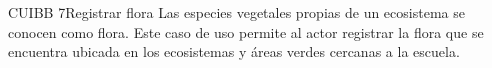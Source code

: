 
\begin{UseCase}{CUIBB 7}{Registrar flora}
    {
	Las especies vegetales propias de un ecosistema se conocen como flora. Este caso de uso permite al actor registrar la flora que se encuentra ubicada en los ecosistemas y áreas verdes cercanas a la escuela.
    }
    
    


\end{UseCase}
